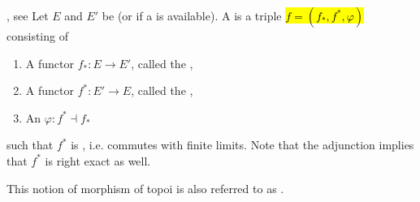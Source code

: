 \begin{definition} {\cite[Expos\'e IV D\'efinition 3.1]{SGA4_I}, see \cite[Definition 2.1]{nlab:geometric_morphism}} \label{definition:morphism_of_topoi}
    Let $E$ and $E'$ be  (or  if a  is available). A  is a triple \hl{$f = (f_*, f^*, \varphi)$} consisting of
    \begin{enumerate}
        \item A functor $f_*: E \to E'$, called the , 
        \item A functor $f^*: E' \to E$, called the , 
        \item An  $\varphi: f^* \dashv f_*$
    \end{enumerate}
    such that $f^*$ is , i.e. commutes with finite limits. Note that the adjunction implies that $f^*$ is right exact as well.

    This notion of morphism of topoi is also referred to as .

\end{definition}